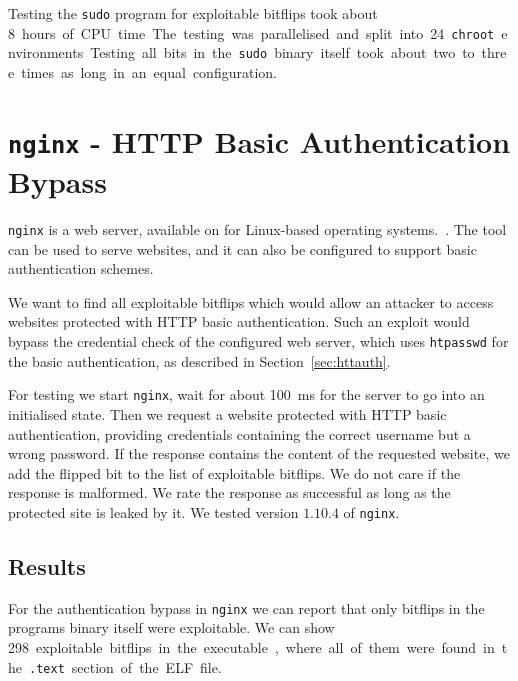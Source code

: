 Testing the \texttt{sudo} program for exploitable bitflips took about \SI{8}
hours of CPU time. The testing was parallelised and split into 24
\texttt{chroot} environments. Testing all bits in the \texttt{sudo} binary
itself took about two to three times as long in an equal configuration.

\section{\texttt{nginx} - HTTP Basic Authentication Bypass}

\texttt{nginx} is a web server, available on for Linux-based operating
systems.~\cite{nginxweb}. The tool can be used to serve websites, and it can
also be configured to support basic authentication schemes.

We want to find all exploitable bitflips which would allow an attacker to access
websites protected with HTTP basic authentication. Such an exploit would bypass
the credential check of the configured web server, which uses \texttt{htpasswd}
for the basic authentication, as described in Section~\ref{sec:httauth}.

For testing we start \texttt{nginx}, wait for about \SI{100}{\milli\second} for
the server to go into an initialised state. Then we request a website protected
with HTTP basic authentication, providing credentials containing the correct
username but a wrong password. If the response contains the content of the
requested website, we add the flipped bit to the list of exploitable bitflips.
We do not care if the response is malformed. We rate the response as successful
as long as the protected site is leaked by it. We tested version $1.10.4$ of
\texttt{nginx}.

\subsection{Results}

For the authentication bypass in \texttt{nginx} we can report that only bitflips
in the program\textquotesingle s binary itself were exploitable. We can show
\SI{298} exploitable bitflips in the executable, where all of them were found in
the \texttt{.text} section of the ELF file.

